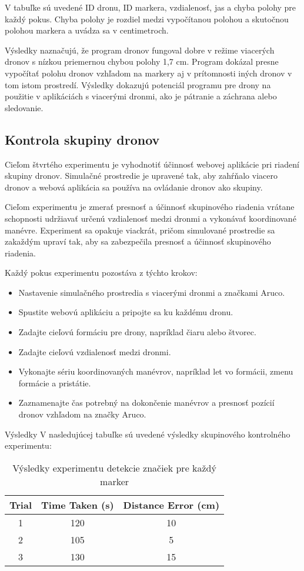V tabuľke sú uvedené ID dronu, ID markera, vzdialenosť, jas a chyba polohy pre každý pokus. Chyba polohy je rozdiel medzi vypočítanou polohou a skutočnou polohou markera a uvádza sa v centimetroch.

Výsledky naznačujú, že program dronov fungoval dobre v režime viacerých dronov s nízkou priemernou chybou polohy 1,7 cm. Program dokázal presne vypočítať polohu dronov vzhľadom na markery aj v prítomnosti iných dronov v tom istom prostredí. Výsledky dokazujú potenciál programu pre drony na použitie v aplikáciách s viacerými dronmi, ako je pátranie a záchrana alebo sledovanie.

\subsection{Kontrola skupiny dronov}
Cieľom štvrtého experimentu je vyhodnotiť účinnosť webovej aplikácie pri riadení skupiny dronov. Simulačné prostredie je upravené tak, aby zahŕňalo viacero dronov a webová aplikácia sa používa na ovládanie dronov ako skupiny.

Cieľom experimentu je zmerať presnosť a účinnosť skupinového riadenia vrátane schopnosti udržiavať určenú vzdialenosť medzi dronmi a vykonávať koordinované manévre. Experiment sa opakuje viackrát, pričom simulované prostredie sa zakaždým upraví tak, aby sa zabezpečila presnosť a účinnosť skupinového riadenia.

Každý pokus experimentu pozostáva z týchto krokov:

\begin{itemize}
    \item  Nastavenie simulačného prostredia s viacerými dronmi a značkami Aruco.
    \item  Spustite webovú aplikáciu a pripojte sa ku každému dronu.
    \item  Zadajte cieľovú formáciu pre drony, napríklad čiaru alebo štvorec.
    \item  Zadajte cieľovú vzdialenosť medzi dronmi.
    \item  Vykonajte sériu koordinovaných manévrov, napríklad let vo formácii, zmenu formácie a pristátie.
    \item  Zaznamenajte čas potrebný na dokončenie manévrov a presnosť pozícií dronov vzhľadom na značky Aruco.
\end{itemize}

Výsledky
V nasledujúcej tabuľke sú uvedené výsledky skupinového kontrolného experimentu:

\begin{table}[h!] 
    \centering
        \begin{tabular}{|c | c | c|} 
        \hline
        Trial & Time Taken (s) & Distance Error (cm) \\ [0.5ex] 
        \hline\hline
        1 & 120 & 10 \\ 
        \hline
        2 & 105 & 5 \\ 
        \hline
        3 & 130 & 15 \\ 
        \hline
       \end{tabular}
       \caption{Výsledky experimentu detekcie značiek pre každý marker}
        \label{table:1}
\end{table}

